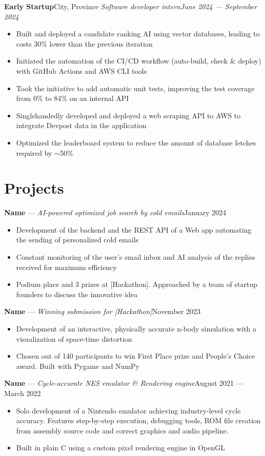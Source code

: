 \documentclass{article}
\newcommand{\newrole}[4]{
    {\normalfont\textbf{#1}\hfill#3}
    \newline
    \textit{#2}\hfill\textit{#4}
}
\newcommand{\shortrole}[3]{
    {\normalfont\textbf{#1} --- \textit{#2}\hfill#3\vspace*{-4pt}}
}
\newenvironment{bulletpoints}{\begin{itemize}\setlength\itemsep{-0.3em}}{\end{itemize}}
\begin{document}
\newrole{Early Startup}{Software developer intern}{City, Province}{June 2024 --- September 2024}
\begin{bulletpoints}
    \item Built and deployed a candidate ranking AI using vector databases, leading to costs 30\% lower than the previous iteration
    \item Initiated the automation of the CI/CD workflow (auto-build, check \& deploy) with GitHub Actions and AWS CLI tools
    \item Took the initiative to add automatic unit tests, improving the test coverage from 0\% to 84\% on an internal API
    \item Singlehandedly developed and deployed a web scraping API to AWS to integrate Devpost data in the application
    \item Optimized the leaderboard system to reduce the amount of database fetches required by $\sim$50\%
\end{bulletpoints}


\section*{Projects}

\shortrole{Name}{AI-powered optimized job search by cold emails}{January 2024}
\begin{bulletpoints}
    \item Development of the backend and the REST API of a Web app automating the sending of personalized cold emails
    \item Constant monitoring of the user's email inbox and AI analysis of the replies received for maximum efficiency
    \item Podium place and 3 prizes at [Hackathon]. Approached by a team of startup founders to discuss the innovative idea 
\end{bulletpoints}

\shortrole{Name}{Winning submission for [Hackathon]}{November 2023}
\begin{bulletpoints}
    \item Development of an interactive, physically accurate n-body simulation with a visualization of space-time distortion
    \item Chosen out of 140 participants to win First Place prize and People’s Choice award. Built with Pygame and NumPy
\end{bulletpoints}

\shortrole{Name}{Cycle-accurate NES emulator \& Rendering engine}{August 2021 --- March 2022}
\begin{bulletpoints}
    \item Solo development of a Nintendo emulator achieving industry-level cycle accuracy. Features step-by-step execution, debugging tools, ROM file creation from assembly source code and correct graphics and audio pipeline.
    \item Built in plain C using a custom pixel rendering engine in OpenGL
\end{bulletpoints}
\end{document}

